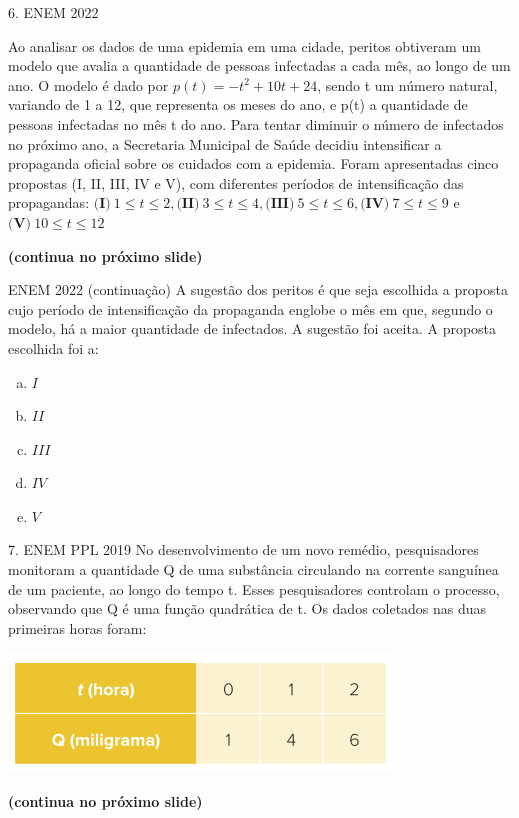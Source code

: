 \documentclass[11pt]{beamer}
\begin{document}
\begin{frame}{6. ENEM 2022}

    Ao analisar os dados de uma epidemia em uma cidade, peritos obtiveram um modelo que avalia a quantidade de pessoas infectadas a cada mês, ao longo de um ano. O modelo é dado por $p(t)=-t^{2}+10t+24$, sendo t um número natural, variando de 1 a 12, que representa os meses do ano, e p(t) a quantidade de pessoas infectadas no mês t do ano. Para tentar diminuir o número de infectados no próximo ano, a Secretaria Municipal de Saúde decidiu intensificar a propaganda oficial sobre os cuidados com a epidemia. Foram apresentadas cinco propostas (I, II, III, IV e V), com diferentes períodos de intensificação das propagandas: $\textbf{(I)}\ 1 \leq t \leq 2, \textbf{(II)}\ 3 \leq t \leq 4, \textbf{(III)}\ 5 \leq t \leq 6, \textbf{(IV)}\ 7 \leq t \leq 9$ e $\textbf{(V)}\ 10 \leq t \leq 12$

    \vfill
    \textbf{(continua no próximo slide)}
\end{frame}
\begin{frame}{ENEM 2022 (continuação)}
    A sugestão dos peritos é que seja escolhida a proposta cujo período de intensificação da propaganda englobe o mês em que, segundo o modelo, há a maior quantidade de infectados. A sugestão foi aceita. A proposta escolhida foi a:

    \begin{enumerate}[a)]
            \item $I$
            \item $II$
            \item $III$ %
            \item $IV$ 
            \item $V$
        \end{enumerate}
\end{frame}

\begin{frame}{7. ENEM PPL 2019}
    No desenvolvimento de um novo remédio, pesquisadores monitoram a quantidade Q de uma substância circulando na corrente sanguínea de um paciente, ao longo do tempo t. Esses pesquisadores controlam o processo, observando que Q é uma função quadrática de t. Os dados coletados nas duas primeiras horas foram:

    \begin{center}
        \includegraphics[scale=0.5]{imagens/enem-ppl-2019.png}
    \end{center} \textbf{(continua no próximo slide)}
\end{frame}
\end{document}
